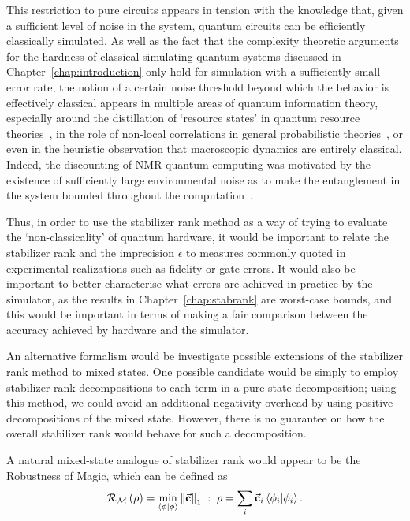 This restriction to pure circuits appears in tension with the knowledge that, given a sufficient level of noise in the system, quantum circuits can be efficiently classically simulated. As well as the fact that the complexity theoretic arguments for the hardness of classical simulating quantum systems discussed in Chapter~\ref{chap:introduction} only hold for simulation with a sufficiently small error rate, the notion of a certain noise threshold beyond which the behavior is effectively classical appears in multiple areas of quantum information theory, especially around the distillation of `resource states' in quantum resource theories~\cite{Bravyi2005,Howard2014,Masanes2006}, in the role of non-local correlations in general probabilistic theories~\cite{Masanese2010}, or even in the heuristic observation that macroscopic dynamics are entirely classical. Indeed, the discounting of NMR quantum computing was motivated by the existence of sufficiently large environmental noise as to make the entanglement in the system bounded throughout the computation~\cite{Braunstein1999}.\par
Thus, in order to use the stabilizer rank method as a way of trying to evaluate the `non-classicality' of quantum hardware, it would be important to relate the stabilizer rank and the imprecision $\epsilon$ to measures commonly quoted in experimental realizations such as fidelity or gate errors. It would also be important to better characterise what errors are achieved in practice by the simulator, as the results in Chapter~\ref{chap:stabrank} are worst-case bounds, and this would be important in terms of making a fair comparison between the accuracy achieved by hardware and the simulator.\par
An alternative formalism would be investigate possible extensions of the stabilizer rank method to mixed states. One possible candidate would be simply to employ stabilizer rank decompositions to each term in a pure state decomposition; using this method, we could avoid an additional negativity overhead by using positive decompositions of the mixed state. However, there is no guarantee on how the overall stabilizer rank would behave for such a decomposition.\par
A natural mixed-state analogue of stabilizer rank would appear to be the Robustness of Magic, which can be defined as~\cite{Howard2017}
\begin{equation}
\mathcal{R}_{\mathcal{M}}\left(\rho\right) = \min_{\braket{\phi}} \norm{\va{c}}_{1}\;:\; \rho = \sum_{i}\va{c}_{i}\braket{\phi_{i}}.
\end{equation}
